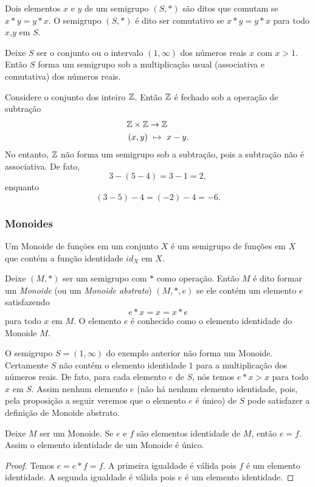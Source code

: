 \begin{definition}[Comutatividade]
  Dois elementos $x$ e $y$ de um semigrupo $(S, *)$ são ditos que comutam se $x* y = y* x$. O semigrupo $(S, *)$ é dito ser comutativo se $x* y = y * x$ para todo $x$,$y$ em $S$.
\end{definition}
\begin{exmp}
  Deixe $S$ ser o conjunto ou o intervalo $(1,\infty)$ dos números reais $x$ com $x > 1$. Então $S$ forma um semigrupo sob a multiplicação usual (associativa e comutativa) dos números reais.
\end{exmp}
\begin{exmp}
  Considere o conjunto dos inteiro $\mathbb{Z}$. Então $\mathbb{Z}$ é fechado sob a operação de subtração
  \begin{alignat}{2}
    &\mathbb{Z} \times \mathbb{Z} \to \mathbb{Z} \nonumber\\
    &\left(x,y\right)\ \mapsto\ x - y.
    \nonumber
  \end{alignat}
  No entanto, $\mathbb{Z}$ não forma um semigrupo sob a subtração, pois a subtração não é associativa. De fato, $$3-(5-4)=3-1=2,$$ enquanto $$(3-5)-4=(-2)-4=-6.$$
\end{exmp}

\subsubsection{Monoides}
Um Monoide de funções em um conjunto $X$ é um semigrupo de funções em $X$ que contém a função identidade $id_{X}$ em $X$.
\begin{definition}
  Deixe $(M, *)$ ser um semigrupo com $*$ como operação. Então $M$ é dito formar um \emph{Monoide} (ou um \emph{Monoide abstrato}) $(M, *, e)$ se ele contém um elemento $e$ satisfazendo $$e * x = x = x * e$$ para todo $x$ em $M$. O elemento $e$ é conhecido como o elemento identidade do Monoide $M$.
\end{definition}
\begin{exmp}
  O semigrupo $S = (1,\infty)$ do exemplo anterior não forma um Monoide. Certamente $S$ não contém o elemento identidade $1$ para a multiplicação dos números reais. De fato, para cada elemento $e$ de $S$, nós temos $e * x > x$ para todo $x$ em $S$. Assim nenhum elemento $e$ (não há nenhum elemento identidade, pois, pela proposição a seguir veremos que o elemento $e$ é único) de $S$ pode satisfazer a definição de Monoide abstrato.
\end{exmp}
\begin{stat}
  Deixe $M$ ser um Monoide. Se $e$ e $f$ são elementos identidade de $M$, então $e=f$. Assim o elemento identidade de um Monoide é único.
  \begin{proof}
    Temos $e=e* f = f$. A primeira igualdade é válida pois $f$ é um elemento identidade. A segunda igualdade é válida pois $e$ é um elemento identidade.
  \end{proof}
\end{stat}

